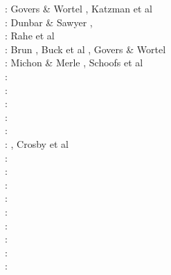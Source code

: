 \begin{scriptsize}
\nineteenninetyfive: Govers \& Wortel \cite{gowo95}, Katzman et al \cite{katl95}\\
\nineteenninetysix: Dunbar \& Sawyer \cite{dusa96}, \cite{beda96}\cite{mada96}\\
\nineteenninetyeight: Rahe et al \cite{rafm98}\\
\nineteenninetynine: Brun \cite{brun99}, Buck et al \cite{bulp99}, Govers \& Wortel \cite{gowo99}\\
\twothousand: Michon \& Merle \cite{mime00}, Schoofs et al \cite{scth00}\\
\twothousandone: \cite{hupc01}\cite{hupc01b}\cite{frbr01}\cite{frnb01a}\cite{frnb01b}\\
\twothousandtwo: \cite{hube02}\cite{hani02}\cite{dabm02}\cite{vacl02}\cite{belz02}\cite{hupc02}
      \cite{hube02b}\cite{vacl02}\cite{labu02}\\
\twothousandthree: \cite{hube03}\cite{hani03}\cite{covb03}\cite{wibm03}\\
\twothousandfour: \cite{hier04}\cite{sees04}\\
\twothousandfive: \cite{hubb05}\cite{coub05}\cite{vanw05}\cite{vabl05}\\
\twothousandsix: \cite{tibs06}\cite{coma06}\cite{crwy06}\cite{peso06}\cite{lemm06}\cite{malm06}, Crosby et al \cite{crms06}\\
\twothousandseven: \cite{huha07}\cite{macl07}\cite{vabl07}\cite{dyrm07}\cite{hube07}\cite{buto07}\cite{socb07}
      \cite{werr07}\\
\twothousandeight: \cite{cort08}\cite{gumb08}\cite{buhb08}\cite{hube08}\cite{peso08}\cite{rerw08}\cite{codh08}\\
\twothousandnine: \cite{agcz09}\cite{kekj09}\cite{sihb09}\\
\twothousandten: \cite{aubh10}\cite{gery10}\cite{fosr10}\cite{gerya2010}\\
\twothousandeleven: \cite{alht11}\cite{ellw11}\cite{hube11}\\
\twothousandtwelve: \cite{alht12}\cite{brps12}\cite{bein12}\\
\twothousandthirteen: \cite{alhf13}\cite{brau13}\cite{chbe13}\cite{knak13}\cite{kern13}\cite{mipf13}\cite{wabd13}
      \cite{gery13}\cite{ligw13}\cite{gery13c}\cite{ebvk13}\\
\twothousandfourteen: \cite{hebr14}\cite{lige14}\cite{brun14}\cite{kobf14}\cite{ebva14}\cite{puge14}\cite{lige14b}
      \cite{hube14}\cite{gogu14}\cite{ebva14}\cite{cosb14}\\
\twothousandfifteen: \cite{nabu15}\cite{clbq15}\cite{huyb15}\cite{shmj15}\cite{svlh15}\cite{wulc15}\cite{olbi15}\\

\end{scriptsize}
